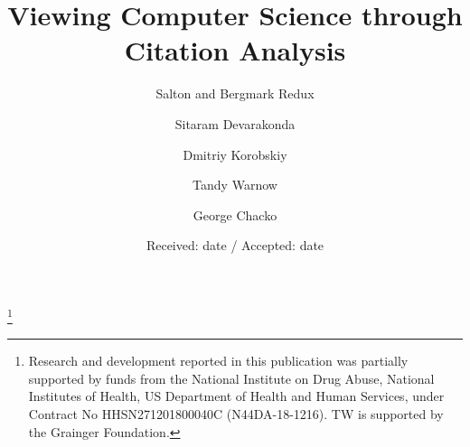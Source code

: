 \title{Viewing Computer Science through Citation Analysis}


\thanks{Research and development reported in this publication was partially supported by funds from the National Institute on Drug Abuse, National Institutes of Health, US Department of Health and Human Services, under Contract No HHSN271201800040C (N44DA-18-1216). TW is supported by the Grainger Foundation.}
\subtitle{Salton and Bergmark Redux}

\author{Sitaram Devarakonda  \and
	Dmitriy Korobskiy \and
        Tandy Warnow \and
        George Chacko }



\date{Received: date / Accepted: date}

\maketitle

